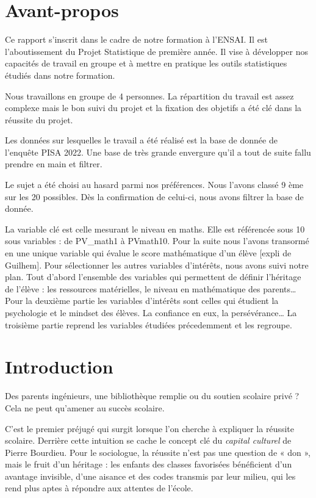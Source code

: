 \documentclass[
  french,
  11pt,
  a4paper,
]{report}
\begin{document}
\chapter{Avant-propos}\label{avant-propos}

Ce rapport s'inscrit dans le cadre de notre formation à l'ENSAI. Il est
l'aboutissement du Projet Statistique de première année. Il vise à
développer nos capacités de travail en groupe et à mettre en pratique
les outils statistiques étudiés dans notre formation.

Nous travaillons en groupe de 4 personnes. La répartition du travail est
assez complexe mais le bon suivi du projet et la fixation des objetifs a
été clé dans la réussite du projet.

Les données sur lesquelles le travail a été réalisé est la base de
donnée de l'enquête PISA 2022. Une base de très grande envergure qu'il a
tout de suite fallu prendre en main et filtrer.

Le sujet a été choisi au hasard parmi nos préférences. Nous l'avons
classé 9 ème sur les 20 possibles. Dès la confirmation de celui-ci, nous
avons filtrer la base de donnée.

La variable clé est celle mesurant le niveau en maths. Elle est
référencée sous 10 sous variables : de PV\_math1 à PVmath10. Pour la
suite nous l'avons transormé en une unique variable qui évalue le score
mathématique d'un élève {[}expli de Guilhem{]}. Pour sélectionner les
autres variables d'intérêts, nous avons suivi notre plan. Tout d'abord
l'ensemble des variables qui permettent de définir l'héritage de l'élève
: les ressources matérielles, le niveau en mathématique des
parents\ldots{} Pour la deuxième partie les variables d'intérêts sont
celles qui étudient la psychologie et le mindset des élèves. La
confiance en eux, la persévérance\ldots{} La troisième partie reprend
les variables étudiées précedemment et les regroupe.

\chapter{Introduction}\label{introduction}

Des parents ingénieurs, une bibliothèque remplie ou du soutien scolaire
privé ? Cela ne peut qu'amener au succès scolaire.

C'est le premier préjugé qui surgit lorsque l'on cherche à expliquer la
réussite scolaire. Derrière cette intuition se cache le concept clé du
\emph{capital culturel} de Pierre Bourdieu. Pour le sociologue, la
réussite n'est pas une question de « don », mais le fruit d'un héritage
: les enfants des classes favorisées bénéficient d'un avantage
invisible, d'une aisance et des codes transmis par leur milieu, qui les
rend plus aptes à répondre aux attentes de l'école.
\end{document}
